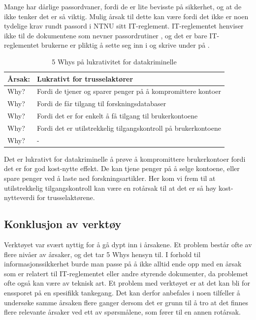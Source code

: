 Mange har dårlige passordvaner, fordi de er lite bevisste på sikkerhet, og at de ikke tenker det er så viktig. Mulig årsak til dette kan være fordi det ikke er noen tydelige krav rundt passord i NTNU sitt IT-reglement. IT-reglementet henviser ikke til de dokumentene som nevner passordrutiner \cite{ITReg}, og det er bare IT-reglementet brukerne er pliktig å sette seg inn i og skrive under på \cite{}. 

\begin{table} [H]
    \centering
    \begin{tabular}{ | m{5em} | m{30em} | }
        \hline
            \cellcolor{yellow} Årsak: & \cellcolor{yellow} Lukrativt for trusselaktører \\
        \hline
            Why? & Fordi de tjener og sparer penger på å kompromittere kontoer \\
        \hline
            Why? & Fordi de får tilgang til forskningsdatabaser \\
        \hline
            Why? & Fordi det er for enkelt å få tilgang til brukerkontoene \\
        \hline
            Why? & Fordi det er utilstrekkelig tilgangskontroll på brukerkontoene \\
        \hline
            Why? & - \\
        \hline
    \end{tabular}
    \caption[5 Whys: Lukrativt for datakriminelle]{5 Whys på lukrativitet for datakriminelle}
    \label{5Whys-passordvaner}
\end{table}

Det er lukrativt for datakriminelle å prøve å kompromittere brukerkontoer fordi det er for god kost-nytte effekt. De kan tjene penger på å selge kontoene, eller spare penger ved å laste ned forskningsartikler. Her kom vi frem til at utilstrekkelig tilgangskontroll kan være en rotårsak til at det er så høy kost-nytteverdi for trusselaktørene.

\subsection{Konklusjon av verktøy}
Verktøyet var svært nyttig for å gå dypt inn i årsakene. Et problem består ofte av flere nivåer av årsaker, og det tar 5 Whys hensyn til. I forhold til informasjonssikkerhet burde man passe på å ikke alltid ende opp med en årsak som er relatert til IT-reglementet eller andre styrende dokumenter, da problemet ofte også kan være av teknisk art. Et problem med verktøyet er at det kan bli for enssporet på en spesifikk tankegang. Det kan derfor anbefales i noen tilfeller å undersøke samme årsaken flere ganger dersom det er grunn til å tro at det finnes flere relevante årsaker ved ett av spørsmålene, som fører til en annen rotårsak. 





